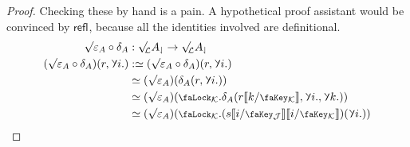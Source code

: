\documentclass[10pt]{article}
\theoremstyle{definition}
\let\oldequiv\equiv%
\renewcommand{\equiv}{\simeq}
\newcommand{\defeq}{\oldequiv}
\newcommand*{\refl}[1]{\mathsf{refl}_{#1}}
\newcommand{\lock}{\mathchoice {\scalebox{0.8}{\text{\faLock}}}
  {\scalebox{0.8}{\text{\faLock}}} {\scalebox{0.5}{\text{\faLock}}}
  {\scalebox{0.4}{\text{\faLock}}} }
\newcommand{\key}{\mathchoice
  {\scalebox{0.8}{\text{\faKey}}} {\scalebox{0.8}{\text{\faKey}}}
  {\scalebox{0.5}{\text{\faKey}}} {\scalebox{0.4}{\text{\faKey}}} }
\newcommand{\rbindsym}{\raisebox{-0.5pt}{\scalerel*{\reflectbox{\rotatebox[origin=c]{185}{$\lambda$}}}{\lambda}}}
\newcommand{\rbind}[1]{\rbindsym{} #1.}
\newcommand{\lockn}[1]{\mathcal{#1}}
\newcommand{\stubra}[1]{\llbracket #1 \rrbracket}
\newcommand{\substucke}[2]{\stubra{#1/\key_{#2}}}
\newcommand{\substuck}[2]{\substucke{#1}{\lockn{#2}}}
\newcommand{\rformsym}{\surd}
\newcommand{\rforme}[2]{\ThisStyle{\raisebox{0.07em}{$\SavedStyle \rformsym_{\hspace{-0.25em}#1}$}} #2}
\newcommand{\rform}[2]{\rforme{\lockn{#1}}{#2}}
\newcommand{\rformu}[1]{\ThisStyle{\raisebox{0.07em}{$\SavedStyle \rformsym$}} #1}
\newcommand{\rintroe}[2]{\lock_{#1}. #2}
\newcommand{\rintro}[2]{\rintroe{\lockn{#1}}{#2}}
\newcommand{\rget}[1]{{#1}_{\downharpoonleft}}
\begin{document}
\begin{proof}
  Checking these by hand is a pain. A hypothetical proof assistant
  would be convinced by $\refl{}$, because all the identities involved
  are definitional.
  \begin{align*}
    \rformu \varepsilon_A \circ \delta_A
    &: \rform{L} \rget{A} \to \rform{L} \rget{A} \\
    (\rformu \varepsilon_A \circ \delta_A)(r, \rbind{i})
    &:\defeq (\rformu \varepsilon_A \circ \delta_A)(r, \rbind{i}) \\
    &\defeq (\rformu \varepsilon_A)(\delta_A(r, \rbind{i})) \\
    &\defeq (\rformu \varepsilon_A)(\rintro{K}{\delta_A(r\substuck{k}{K}, \rbind{i}, \rbind{k})}) \\
    &\defeq (\rformu \varepsilon_A)(\rintro{K}{(s\substuck{i}{J}\substuck{i}{K})(\rbind{i})}) \\
  \end{align*}


\end{proof}
\end{document}
